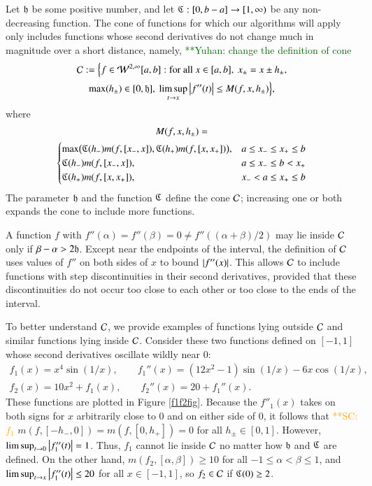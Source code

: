 \documentclass[review]{elsarticle}
\makeatletter
\newcommand{\Vast}{\bBigg@{6}}
\theoremstyle{definition}
\newcommand{\Vastr}{\mathclose\Vast}
\newcommand{\yuhannote}[1]{  {\textcolor{darkgreen}  {\mbox{**Yuhan:} #1}}}
\newcommand{\scnote}[1]{ {\textcolor{orange}  {\mbox{**SC:} #1}}}
\makeatother
\begin{document}
Let $\mathfrak{h}$ be some positive number, and let $\mathfrak{C} : [0,b-a] \to [1,\infty)$ be any
non-decreasing function. The cone of functions for which our algorithms will
apply only includes functions whose second derivatives do not change much in
magnitude over a short distance, namely,\yuhannote{change the definition of cone}
\begin{multline} \label{conedef}
\nonumber \mathcal{C} :=   \Bigl \{
 f  \in    \mathcal{W}^{2,\infty}[a,b]:    \text{for all } x \in [a,b], \ x_\pm = x \pm h_\pm,
\\  \max(h_{\pm}) \in [0, \mathfrak{h}], \  \limsup_{t \to x}\left \lvert f''(t) \right \rvert  \le M(f,x,h_\pm) \Bigr \},
\end{multline}
where
\begin{multline*}
M(f,x,h_\pm)=\\
\begin{cases}
  \max\bigl(\fC(h_{-}) m(f,[x_-,x]),\fC(h_{+}) m(f,[x,x_+])\bigr), & a \le x_- \le x_+ \le b\\
\fC(h_{-}) m(f,[x_-,x]), & a \le x_- \le b <  x_+\\
\fC(h_{+}) m(f,[x,x_+]), & x_- < a \le x_+ \le b
\end{cases} %
\end{multline*}
The parameter $\mathfrak{h}$ and the function $\mathfrak{C}$ define the cone $\mathcal{C}$; increasing
one or both expands the cone to include more functions.

A function $f$ with $f''(\alpha) = f''(\beta) = 0 \ne f''((\alpha+\beta)/2)$ may
lie inside $\mathcal{C}$ only if $\beta - \alpha > 2\mathfrak{h}$. Except near the endpoints of
the interval, the definition of $\mathcal{C}$ uses values of $f''$ on both sides of $x$
to bound $\left \lvert f''(x) \right \rvert$. This allows $\mathcal{C}$ to include functions with step
discontinuities in their second derivatives, provided that these discontinuities
do not occur too close to each other or too close to the ends of the interval.

To better understand $\mathcal{C}$, we provide examples of functions lying outside $\mathcal{C}$
and similar functions lying inside $\mathcal{C}$. Consider these two functions defined
on $[-1,1]$ whose second derivatives oscillate wildly near $0$:
\begin{gather*}
f_1(x) = x^4 \sin(1/x), \qquad f_1''(x) = (12x^2 - 1) \sin(1/x) -6 x \cos(1/x), \\
f_2(x) = 10  x^2 + f_1(x), \qquad f_2''(x) = 20+ f_1''(x).
\end{gather*}
These functions are plotted in Figure \ref{f1f2fig}. Because the $f''_1(x)$
takes on both signs for $x$ arbitrarily close to $0$ and on either side of $0$,
it follows that \scnote{$f_1$}  $m(f,[-h_-,0]) = m(f,[0,h_+]) = 0$ for all $h_\pm \in [0,1]$.
However, $\limsup_{t \to 0} \left \lvert f''_1(t) \right \rvert = 1$. Thus, $f_1$ cannot lie inside
$\mathcal{C}$ no matter how $\mathfrak{h}$ and $\mathfrak{C}$ are defined. On the other hand,
$m(f_2,[\alpha, \beta]) \ge 10$ for all $-1 \le \alpha < \beta \le 1$, and
$\limsup_{t \to x} \left \lvert f''_1(t) \right \rvert \le 20$ for all $x \in [-1,1]$, so $f_2 \in
\mathcal{C}$ if $\mathfrak{C}(0) \ge 2$.
\end{document}
